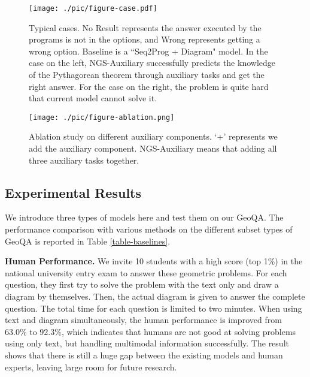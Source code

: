 \documentclass[11pt,a4paper]{article}
\begin{document}
\begin{figure*}[t]
\begin{center}
 \texttt{[image: ./pic/figure-case.pdf]}
\end{center}
  \caption{Typical cases. No Result represents the answer executed by the programs is not in the options, and Wrong represents getting a wrong option. Baseline is a ``Seq2Prog + Diagram" model. In the case on the left, NGS-Auxiliary successfully predicts the knowledge of the Pythagorean theorem through auxiliary tasks and get the right answer. For the case on the right, the problem is quite hard that current model cannot solve it. 
  }
\label{fig:case}
\end{figure*}


\begin{figure}[t]
\begin{center}
 \texttt{[image: ./pic/figure-ablation.png]}
\end{center}
  \caption{Ablation study on different auxiliary
components. ‘+’ represents we add the auxiliary component. NGS-Auxiliary means that adding all three auxiliary tasks together.
  }
\label{fig:ablation}
\end{figure}


\subsection{Experimental Results}


We introduce three types of models here and test them on our GeoQA.
The performance comparison with various methods on the different subset types of GeoQA is reported in Table \ref{table-baselines}. 






\textbf{Human Performance.}
We invite 10 students with a high score (top 1\%) in the national university entry exam to answer these geometric problems. 
For each question, they first try to solve the problem with the text only and draw a diagram by themselves. Then, the actual diagram is given to answer the complete question. The total time for each question is limited to two minutes.  When using text and diagram simultaneously, the human performance is improved from 63.0\% to 92.3\%, which indicates that humans are not good at solving problems using only text, but handling multimodal information successfully.
The result shows that there is still a huge gap between the existing models and human experts, leaving large room for future research.
\end{document}
